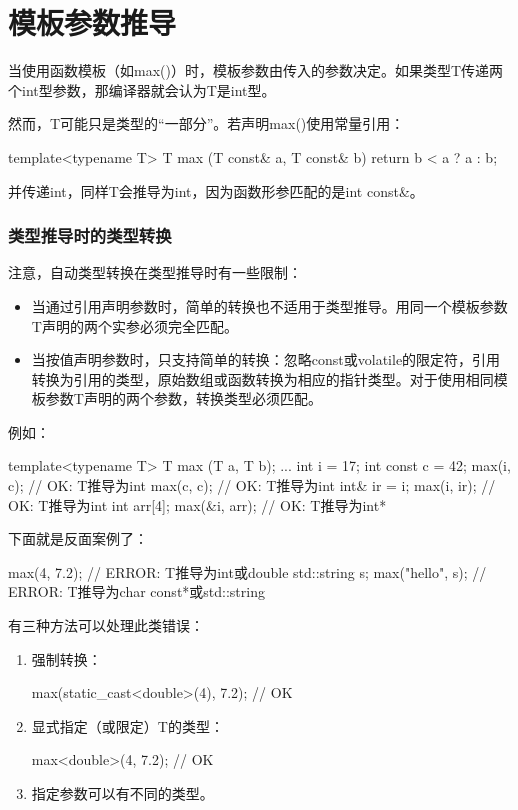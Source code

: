 \section{模板参数推导}

当使用函数模板（如max()）时，模板参数由传入的参数决定。如果类型T传递两个int型参数，那编译器就会认为T是int型。

然而，T可能只是类型的“一部分”。若声明max()使用常量引用：

\begin{cpp}
template<typename T>
T max (T const& a, T const& b) {
	return b < a ? a : b;
}
\end{cpp}

并传递int，同样T会推导为int，因为函数形参匹配的是int const\&。

\subsubsection{类型推导时的类型转换}

注意，自动类型转换在类型推导时有一些限制：

\begin{itemize}
\item
当通过引用声明参数时，简单的转换也不适用于类型推导。用同一个模板参数T声明的两个实参必须完全匹配。

\item
当按值声明参数时，只支持简单的转换：忽略const或volatile的限定符，引用转换为引用的类型，原始数组或函数转换为相应的指针类型。对于使用相同模板参数T声明的两个参数，转换类型必须匹配。
\end{itemize}

例如：

\begin{cpp}
template<typename T>
T max (T a, T b);
...
int i = 17;
int const c = 42;
max(i, c); // OK: T推导为int
max(c, c); // OK: T推导为int
int& ir = i;
max(i, ir); // OK: T推导为int
int arr[4];
max(&i, arr); // OK: T推导为int*
\end{cpp}

下面就是反面案例了：

\begin{cpp}
max(4, 7.2); // ERROR: T推导为int或double
std::string s;
max("hello", s); // ERROR: T推导为char const*或std::string
\end{cpp}

有三种方法可以处理此类错误：

\begin{enumerate}
\item
强制转换：
\begin{cpp}
max(static_cast<double>(4), 7.2); // OK
\end{cpp}

\item
显式指定（或限定）T的类型：
\begin{cpp}
max<double>(4, 7.2); // OK
\end{cpp}

\item
指定参数可以有不同的类型。
\end{enumerate}


